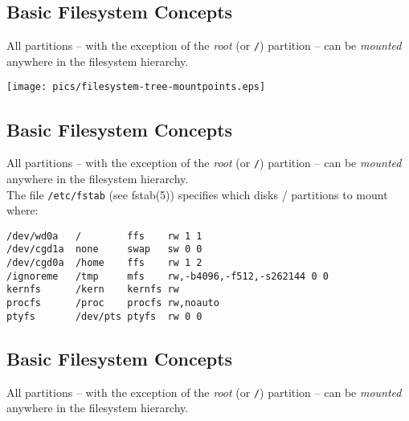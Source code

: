 \documentclass[xga]{xdvislides}
\begin{document}
\subsection{Basic Filesystem Concepts}
All partitions -- with the exception of the {\em root} (or \verb+/+) partition
-- can be {\em mounted} anywhere in the filesystem hierarchy.
\\

\begin{center}
	\texttt{[image: pics/filesystem-tree-mountpoints.eps]} \\
\end{center}

%
%
\subsection{Basic Filesystem Concepts}
All partitions -- with the exception of the {\em root} (or \verb+/+) partition
-- can be {\em mounted} anywhere in the filesystem hierarchy.
\\

The file \verb+/etc/fstab+ (see fstab(5)) specifies which disks / partitions
to mount where:
\\
\begin{verbatim}
/dev/wd0a   /        ffs    rw 1 1
/dev/cgd1a  none     swap   sw 0 0
/dev/cgd0a  /home    ffs    rw 1 2
/ignoreme   /tmp     mfs    rw,-b4096,-f512,-s262144 0 0
kernfs      /kern    kernfs rw
procfs      /proc    procfs rw,noauto
ptyfs       /dev/pts ptyfs  rw 0 0
\end{verbatim}
\Normalsize

\subsection{Basic Filesystem Concepts}
All partitions -- with the exception of the {\em root} (or \verb+/+) partition
-- can be {\em mounted} anywhere in the filesystem hierarchy.
\\
\end{document}
